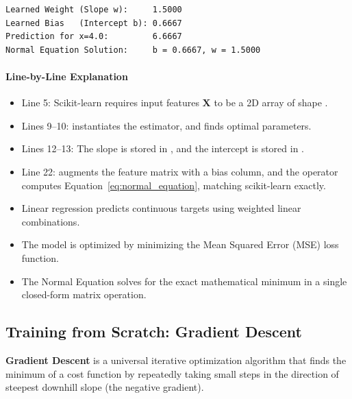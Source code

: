 \begin{lstlisting}[style=outputstyle]
Learned Weight (Slope w):     1.5000
Learned Bias   (Intercept b): 0.6667
Prediction for x=4.0:         6.6667
Normal Equation Solution:     b = 0.6667, w = 1.5000
\end{lstlisting}

\paragraph{Line-by-Line Explanation}
\begin{itemize}
    \item Line 5: Scikit-learn requires input features $\mathbf{X}$ to be a 2D array of shape .
    \item Lines 9--10:  instantiates the estimator, and  finds optimal parameters.
    \item Lines 12--13: The slope is stored in , and the intercept is stored in .
    \item Line 22:  augments the feature matrix with a bias column, and the  operator computes Equation~\ref{eq:normal_equation}, matching scikit-learn exactly.
\end{itemize}

\begin{takeaways}
\begin{itemize}
    \item Linear regression predicts continuous targets using weighted linear combinations.
    \item The model is optimized by minimizing the Mean Squared Error (MSE) loss function.
    \item The Normal Equation solves for the exact mathematical minimum in a single closed-form matrix operation.
\end{itemize}
\end{takeaways}

\subsection{Training from Scratch: Gradient Descent}

\begin{keyidea}
\textbf{Gradient Descent} is a universal iterative optimization algorithm that finds the minimum of a cost function by repeatedly taking small steps in the direction of steepest downhill slope (the negative gradient).
\end{keyidea}

